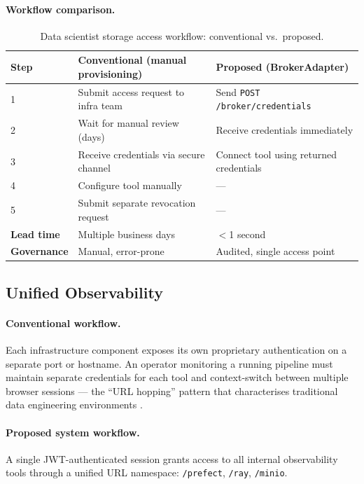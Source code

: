 \documentclass[12pt, a4paper]{report}
\begin{document}
\paragraph{Workflow comparison.}

\begin{table}[H]
  \centering
  \caption{Data scientist storage access workflow: conventional vs.\ proposed.}
  \label{tab:broker_workflow}
  \begin{tabularx}{\textwidth}{lXX}
    \toprule
    \textbf{Step} &
    \textbf{Conventional (manual provisioning)} &
    \textbf{Proposed (BrokerAdapter)} \\
    \midrule
    1 & Submit access request to infra team & Send \texttt{POST /broker/credentials} \\
    2 & Wait for manual review (days)       & Receive credentials immediately \\
    3 & Receive credentials via secure channel & Connect tool using returned credentials \\
    4 & Configure tool manually             & --- \\
    5 & Submit separate revocation request  & --- \\
    \midrule
    \textbf{Lead time}  & Multiple business days & $<$1 second \\
    \textbf{Governance} & Manual, error-prone    & Audited, single access point \\
    \bottomrule
  \end{tabularx}
\end{table}

\subsection{Unified Observability}
\label{ssec:bouncer_usability}

\paragraph{Conventional workflow.}
Each infrastructure component exposes its own proprietary authentication on a separate
port or hostname. An operator monitoring a running pipeline must maintain separate
credentials for each tool and context-switch between multiple browser sessions —
the ``URL hopping'' pattern that characterises traditional data engineering
environments \citep{Bornstein2023}.

\paragraph{Proposed system workflow.}
A single JWT-authenticated session grants access to all internal observability tools
through a unified URL namespace: \texttt{/prefect}, \texttt{/ray}, \texttt{/minio}.
\end{document}
